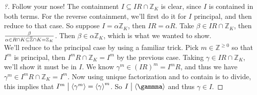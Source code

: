 \begin{proof}[?]

Follow your nose! The containment \(I \subseteq IR \cap{\mathbb{Z}}_K\)
is clear, since \(I\) is contained in both terms. For the reverse
containment, we'll first do it for \(I\) principal, and then reduce to
that case. So suppose \(I = \alpha {\mathbb{Z}}_K\), then
\(IR = \alpha R\). Take \(\beta \in IR \cap{\mathbb{Z}}_K\), then
\(\beta\over \alpha \in R \cap K \subseteq \mkern 1.5mu\overline{\mkern-1.5mu{\mathbb{Z}}\mkern-1.5mu}\mkern 1.5mu\cap K = {\mathbb{Z}}_K\).
Then \(\beta \in \alpha {\mathbb{Z}}_K\), which is what we wanted to
show.\\

We'll reduce to the principal case by using a familiar trick. Pick
\(m\in {\mathbb{Z}}^{\geq 0}\) so that \(I^m\) is principal, then
\(I^m R \cap{\mathbb{Z}}_K = I^m\) by the previous case. Taking
\(\gamma\in IR \cap{\mathbb{Z}}_K\), we'll show it must be in \(I\). We
know \(\gamma^m \in (IR)^m = I^m R\), and thus we have
\(\gamma^m \in I^m R \cap{\mathbb{Z}}_K = I^m\). Now using unique
factorization and to contain is to divide, this implies that
\(I^m \bigm|\left\langle{ \gamma ^m }\right\rangle= \left\langle{ \gamma }\right\rangle^m\).
So \(I \bigm|\left\langle{ \gammma }\right\rangle\) and thus
\(\gamma \in I\).

\end{proof}

